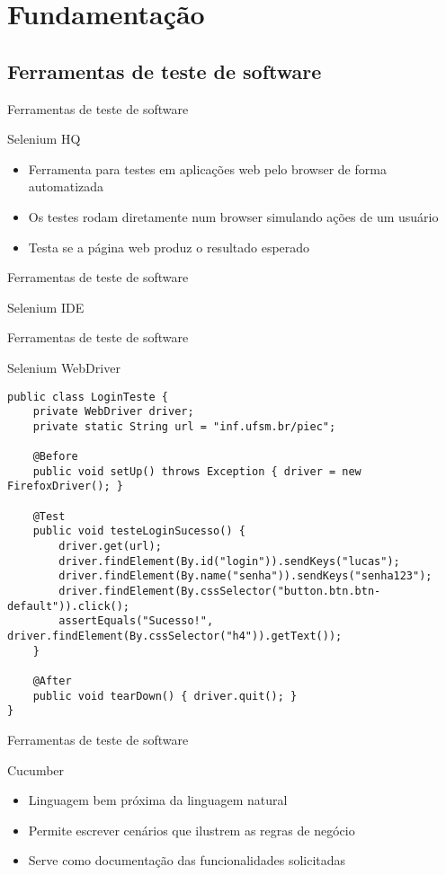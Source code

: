 \documentclass{beamer}
\begin{document}
\section{Fundamentação}
\subsection{Ferramentas de teste de software}
\begin{frame}{Ferramentas de teste de software}
    \item Selenium HQ
	\begin{itemize}
		\item Ferramenta para testes em aplicações web pelo browser de forma automatizada
        \item Os testes rodam diretamente num browser simulando ações de um usuário
        \item Testa se a página web produz o resultado esperado
	\end{itemize}
\end{frame}
\begin{frame}{Ferramentas de teste de software}
    \item Selenium IDE
    \begin{center}\end{center}
\end{frame}
\begin{frame}[fragile]{Ferramentas de teste de software}
    \item Selenium WebDriver
    \begin{lstlisting}
public class LoginTeste {
    private WebDriver driver;
    private static String url = "inf.ufsm.br/piec";
    
    @Before
    public void setUp() throws Exception { driver = new FirefoxDriver(); }
    
    @Test
    public void testeLoginSucesso() {
        driver.get(url);
        driver.findElement(By.id("login")).sendKeys("lucas");
        driver.findElement(By.name("senha")).sendKeys("senha123");
        driver.findElement(By.cssSelector("button.btn.btn-default")).click();
        assertEquals("Sucesso!", driver.findElement(By.cssSelector("h4")).getText());
    }
    
    @After
    public void tearDown() { driver.quit(); }
}
	\end{lstlisting}
\end{frame}
\begin{frame}[fragile]{Ferramentas de teste de software}
    \item Cucumber
	\begin{itemize}
		\item Linguagem bem próxima da linguagem natural
		\item Permite escrever cenários que ilustrem as regras de negócio
        \item Serve como documentação das funcionalidades solicitadas
	\end{itemize}
\end{frame}
\end{document}
